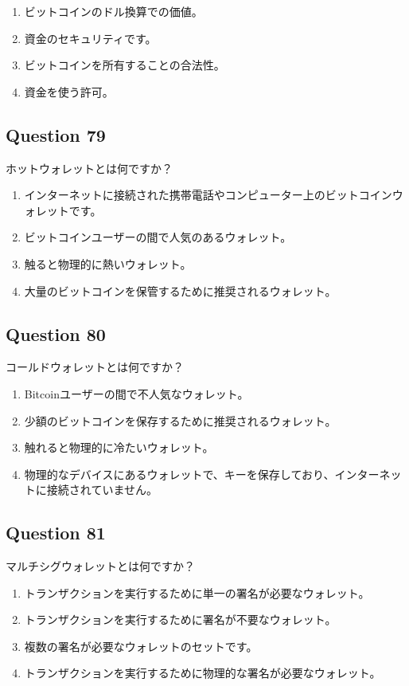 \documentclass[12pt,a4paper]{article}
\begin{document}
\begin{enumerate}[label=\Alph*., leftmargin=*]
\item ビットコインのドル換算での価値。
\item 資金のセキュリティです。
\item ビットコインを所有することの合法性。
\item 資金を使う許可。
\end{enumerate}

\bigskip


\subsection*{Question 79}
ホットウォレットとは何ですか？

\begin{enumerate}[label=\Alph*., leftmargin=*]
\item インターネットに接続された携帯電話やコンピューター上のビットコインウォレットです。
\item ビットコインユーザーの間で人気のあるウォレット。
\item 触ると物理的に熱いウォレット。
\item 大量のビットコインを保管するために推奨されるウォレット。
\end{enumerate}

\bigskip


\subsection*{Question 80}
コールドウォレットとは何ですか？

\begin{enumerate}[label=\Alph*., leftmargin=*]
\item Bitcoinユーザーの間で不人気なウォレット。
\item 少額のビットコインを保存するために推奨されるウォレット。
\item 触れると物理的に冷たいウォレット。
\item 物理的なデバイスにあるウォレットで、キーを保存しており、インターネットに接続されていません。
\end{enumerate}

\bigskip


\subsection*{Question 81}
マルチシグウォレットとは何ですか？

\begin{enumerate}[label=\Alph*., leftmargin=*]
\item トランザクションを実行するために単一の署名が必要なウォレット。
\item トランザクションを実行するために署名が不要なウォレット。
\item 複数の署名が必要なウォレットのセットです。
\item トランザクションを実行するために物理的な署名が必要なウォレット。
\end{enumerate}
\end{document}
